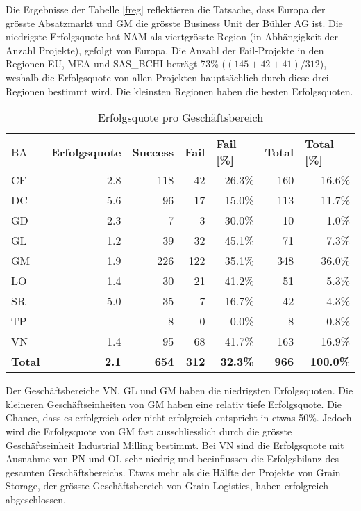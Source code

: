 Die Ergebnisse der Tabelle \ref{freg} reflektieren die Tatsache, dass Europa der grösste Absatzmarkt und GM die grösste Business Unit der Bühler AG ist. Die niedrigste Erfolgsquote hat NAM als viertgrösste Region (in Abhängigkeit der Anzahl Projekte), gefolgt von Europa. Die Anzahl der Fail-Projekte in den Regionen EU, MEA und SAS\_BCHI beträgt 73\% ($(145+42+41)/312$), weshalb die Erfolgsquote von allen Projekten hauptsächlich durch diese drei Regionen bestimmt wird. Die kleinsten Regionen haben die besten Erfolgsquoten. 
\begin{table}[H]
	\centering
	\caption{Erfolgsquote pro Geschäftsbereich}
	\begin{tabular}{lrrrrrr}
		BA    & \multicolumn{1}{l}{\textbf{Erfolgsquote}} & \multicolumn{1}{l}{\textbf{Success}} & \multicolumn{1}{l}{\textbf{Fail}} & \multicolumn{1}{l}{\textbf{Fail [\%]}} & \multicolumn{1}{l}{\textbf{Total}} & \multicolumn{1}{l}{\textbf{Total [\%]}} \\
		CF    & 2.8   & 118   & 42    & 26.3\% & 160   & 16.6\% \\
		DC    & 5.6   & 96    & 17    & 15.0\% & 113   & 11.7\% \\
		GD    & 2.3   & 7     & 3     & 30.0\% & 10    & 1.0\% \\
		GL    & 1.2   & 39    & 32    & 45.1\% & 71    & 7.3\% \\
		GM    & 1.9   & 226   & 122   & 35.1\% & 348   & 36.0\% \\
		LO    & 1.4   & 30    & 21    & 41.2\% & 51    & 5.3\% \\
		SR    & 5.0   & 35    & 7     & 16.7\% & 42    & 4.3\% \\
		TP    &       & 8     & 0     & 0.0\% & 8     & 0.8\% \\
		VN    & 1.4   & 95    & 68    & 41.7\% & 163   & 16.9\% \\
		\textbf{Total } & \textbf{2.1} & \textbf{654} & \textbf{312} & \textbf{32.3\%} & \textbf{966} & \textbf{100.0\%} \\
	\end{tabular}%
	\label{tab:addlabel}%
\end{table}%
 Der Geschäftsbereiche VN, GL und GM haben die niedrigsten Erfolgsquoten.
\newpage
Die kleineren Geschäftseinheiten von GM haben eine relativ tiefe Erfolgsquote. Die Chance, dass es erfolgreich oder nicht-erfolgreich entspricht in etwas 50\%. Jedoch wird die Erfolgsquote von GM fast ausschliesslich durch die grösste Geschäftseinheit Industrial Milling bestimmt. Bei VN sind die Erfolgsquote mit Ausnahme von PN und OL sehr niedrig und beeinflussen die Erfolgsbilanz des gesamten Geschäftsbereichs. Etwas mehr als die Hälfte der Projekte von Grain Storage, der grösste Geschäftsbereich von Grain Logistics, haben erfolgreich abgeschlossen. 
